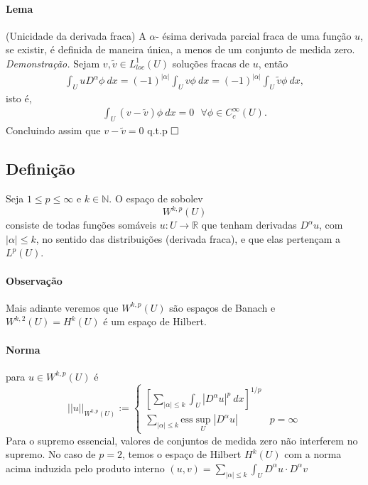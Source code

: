 \documentclass[a4paper, 11pt]{book}
\newcommand{\qed}{$\hfill\square$}
\newcommand{\N}{\mathbb{N}}
\newcommand{\R}{\mathbb{R}}
\begin{document}
\paragraph{Lema}(Unicidade da derivada fraca) A $\alpha$- ésima derivada parcial fraca de uma função $u$, se existir, é definida de maneira única, a menos de um conjunto de medida zero.
\textit{Demonstração.} Sejam $v, \tilde{v} \in L^1_{loc}(U)$ soluções fracas de $u$, então
 \begin{align*}
     \int_{U}u D^{\alpha}\phi \ dx = (-1)^{|\alpha|} \int _U v \phi \ dx= (-1)^{|\alpha|} \int _U \tilde{v} \phi \ dx,
 \end{align*}
isto é,
\begin{align*}
    \int_{U} (v - \tilde{v}) \phi \ dx = 0 \ \ \ \forall \phi \in C^{\infty}_c(U).
\end{align*}
Concluindo assim que $v-\tilde{v}=0$ q.t.p \qed
\subsection*{Definição}

Seja \( 1\leq p \leq \infty \) e \( k \in \N \). O espaço de sobolev \[ W^{k,p}(U) \] consiste de todas funções somáveis \( u:U\rightarrow\R \) que tenham derivadas \( D^\alpha u \), com \( |\alpha|\leq k \), no sentido das distribuições (derivada fraca), e que elas pertençam a \( L^p(U) \).

\paragraph{Observação} Mais adiante veremos que $W^{k,p}(U)$ são espaços de Banach e $ W^{k,2}(U) = H^k(U)$ é um espaço de Hilbert.

\paragraph{Norma} para \( u \in W^{k,p}(U) \) é \[ ||u||_{W^{k,p}(U)} := \begin{cases}
	\left[ \sum_{|\alpha|\leq k} \int_U \left| D^{\alpha} u\right|^p\ dx  \right]^{1/p}\\
	\sum_{|\alpha|\leq k} \text{ess}\sup_U \left| D^{\alpha} u \right| & p=\infty
\end{cases}\]Para o supremo essencial, valores de conjuntos de medida zero não interferem no supremo. No caso de \( p=2 \), temos o espaço de Hilbert \( H^k(U) \) com a norma acima induzida pelo produto interno \( (u,v) =\sum_{|\alpha|\leq k} \int_U D^{\alpha}u \cdot D^\alpha v   \)
\end{document}
